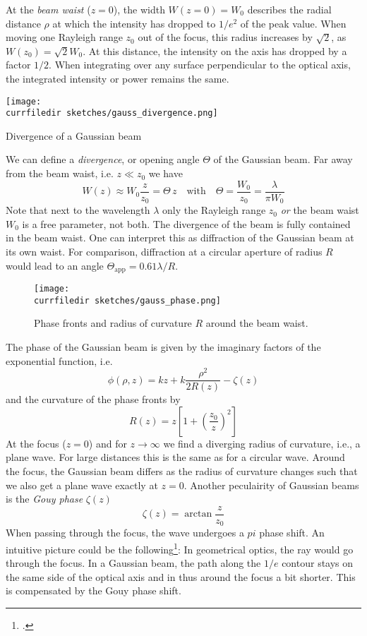 At the \emph{beam waist} ($z=0$), the width $W(z=0) = W_0$ describes the radial distance $\rho$ at which the intensity  has dropped to $1/e^2$ of the peak value. When moving one Rayleigh range $z_0$ out of the focus, this radius increases by $\sqrt{2}$, as $W(z_0) = \sqrt{2} W_0$. At this distance, the intensity on the axis has dropped by a factor $1/2$. When integrating over any surface perpendicular to the optical axis, the integrated intensity or power remains the same.

\begin{marginfigure}
    \texttt{[image: \\currfiledir sketches/gauss\_divergence.png]}
   \caption{Divergence of a Gaussian beam}
\end{marginfigure}


We can define a \emph{divergence}, or opening angle $\Theta$ of the Gaussian beam. Far away from the beam waist, i.e. $z \ll z_0$ we have
\begin{equation}
    W(z) \approx W_0 \frac{z}{z_0} = \Theta \, z \quad \text{with} \quad \Theta = \frac{W_0}{z_0} = \frac{\lambda}{\pi W_0}
 \end{equation}
 Note that next to the wavelength $\lambda$ only the Rayleigh range $z_0$ \emph{or} the beam waist $W_0$ is a free parameter, not both. The divergence of the beam is fully contained in the beam waist. One can interpret this as diffraction of the Gaussian beam at its own waist. For comparison, diffraction at a circular aperture of radius $R$ would  lead to an angle $\Theta_\text{app} = 0.61 \lambda  / R$.

 \begin{figure}
    \texttt{[image: \\currfiledir sketches/gauss\_phase.png]}
   \caption{Phase fronts and radius of curvature $R$ around the beam waist.}
\end{figure}

The phase of the Gaussian beam is given by the imaginary factors of the exponential function, i.e.
\begin{equation}
    \phi(\rho, z) = k z + k  \frac{\rho^2}{2 R(z)}  -  \zeta(z) 
\end{equation}
and the curvature of the phase fronts by 
\begin{equation}
    R(z) = z \left[ 1 + \left( \frac{z_0}{z} \right)^2 \right] 
\end{equation}
At the focus ($z=0$) and for $z \rightarrow \infty$ we find a diverging radius of curvature, i.e., a plane wave. For large distances this is the same as for a circular wave. Around the focus, the Gaussian beam differs as the radius of curvature changes such that we also get a plane wave exactly at $z=0$. Another peculairity of Gaussian beams is the \emph{Gouy phase} $\zeta(z)$
\begin{equation}
    \zeta(z) =  \arctan \frac{z}{z_0} 
\end{equation}
When passing through the focus, the wave undergoes a $pi$ phase shift. An intuitive picture could be the following\footcite{Boyd1980IntuitiveEO}: In geometrical optics, the ray would go through the focus. In a Gaussian beam, the path along the $1/e$ contour stays on the same side of the optical axis and in thus around the focus a bit shorter. This is compensated by the Gouy phase shift.

